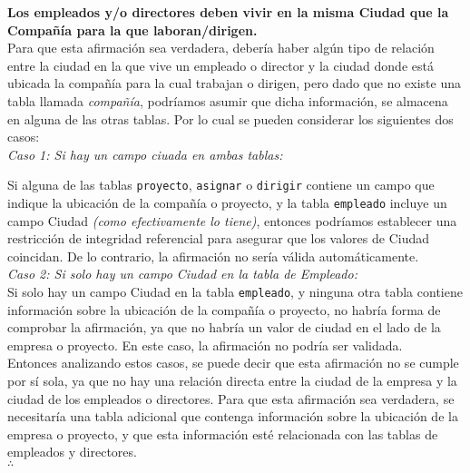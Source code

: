 \textbf{Los empleados y/o directores deben vivir en la misma Ciudad que la Compañía para la que laboran/dirigen.}\vspace{.3cm} \\

Para que esta afirmación sea verdadera, debería haber algún tipo de relación entre la ciudad en la que vive un empleado o director y la ciudad donde está ubicada la compañía para la cual trabajan o dirigen, pero dado que no existe una tabla llamada \textit{compañía}, podríamos asumir que dicha información, se almacena en alguna de las otras tablas. Por lo cual se pueden considerar los siguientes dos casos: \\

\textit{Caso 1: Si hay un campo ciuada en ambas tablas:}

Si alguna de las tablas \texttt{proyecto}, \texttt{asignar} o \texttt{dirigir} contiene un campo que indique la ubicación de la compañía o proyecto, y la tabla \texttt{empleado} incluye un campo Ciudad \textit{(como efectivamente lo tiene)}, entonces podríamos establecer una restricción de integridad referencial para asegurar que los valores de Ciudad coincidan. De lo contrario, la afirmación no sería válida automáticamente.\\

\textit{Caso 2: Si solo hay un campo Ciudad en la tabla de Empleado:} \\

Si solo hay un campo Ciudad en la tabla \texttt{empleado}, y ninguna otra tabla contiene información sobre la ubicación de la compañía o proyecto, no habría forma de comprobar la afirmación, ya que no habría un valor de ciudad en el lado de la empresa o proyecto. En este caso, la afirmación no podría ser validada. \\


Entonces analizando estos casos, se puede decir que esta afirmación no se cumple por sí sola, ya que no hay una relación directa entre la ciudad de la empresa y la ciudad de los empleados o directores. Para que esta afirmación sea verdadera, se necesitaría una tabla adicional que contenga información sobre la ubicación de la empresa o proyecto, y que esta información esté relacionada con las tablas de empleados y directores. \\

$\therefore$  \\

